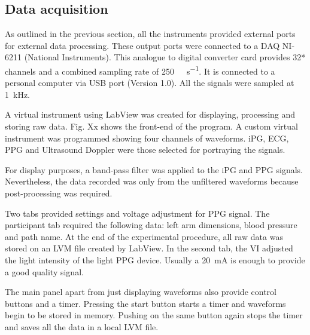 


\subsection{Data acquisition}
\label{section4.1.2}

As outlined in the previous section, all the instruments provided external ports for external data processing. These output ports were connected to a DAQ NI-6211 (National Instruments). This analogue to digital converter card provides 32* channels and a combined sampling rate of \SI{250}{\kilo\sample\per\second}. It is connected to a personal computer via USB port (Version 1.0). All the signals were sampled at \SI{1}{\kilo\hertz}.


A virtual instrument using LabView was created for displaying, processing and storing raw data. Fig. Xx shows the front-end of the program. A custom virtual instrument was programmed showing four channels of waveforms. iPG, ECG, PPG and Ultrasound Doppler were those selected for portraying the signals.


For display purposes, a band-pass filter was applied to the iPG and PPG signals. Nevertheless, the data recorded  was only from the unfiltered waveforms because post-processing was required.  


Two tabs provided settings and voltage adjustment for PPG signal. The participant tab required the following data: left arm dimensions, blood pressure and path name. At the end of the experimental procedure, all raw data was stored on an LVM file created by LabView. In the second tab, the VI adjusted the light intensity of the light PPG device. Usually a \SI{20}{\milli\ampere} is enough to provide a good quality signal. 

The main panel apart from just displaying waveforms also provide control buttons and a timer.  Pressing the start button starts a timer and waveforms begin to be stored in memory. Pushing on the same button again stops the timer and saves all the data in a local LVM file. 

